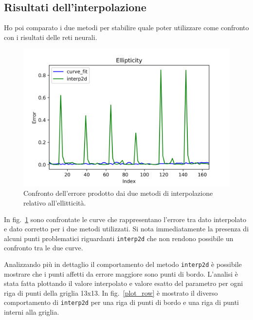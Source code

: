 \documentclass[12pt,a4paper,final]{book}
\begin{document}
\subsection{Risultati dell'interpolazione}\label{risultati_interpolazione}
Ho poi comparato i due metodi per stabilire quale poter utilizzare come confronto con i risultati delle reti neurali.
\begin{figure}[!ht]
	\centering
	\includegraphics[scale=0.8]{../figures/error_comparison_all.png}
	\caption{Confronto dell'errore prodotto dai due metodi di interpolazione relativo all'ellitticità.}
	\label{err_int}
\end{figure}
In fig.~\ref{err_int} sono confrontate le curve che rappresentano l'errore tra dato interpolato e dato corretto per i due metodi utilizzati. Si nota immediatamente la presenza di alcuni punti problematici riguardanti \texttt{interp2d} che non rendono possibile un confronto tra le due curve.


Analizzando più in dettaglio il comportamento del metodo \texttt{interp2d} è possibile mostrare che i punti affetti da errore maggiore sono punti di bordo. L'analisi è stata fatta plottando il valore interpolato e valore esatto del parametro per ogni riga di punti della griglia 13x13.
In fig.~\ref{plot_row} è mostrato il diverso comportamento di \texttt{interp2d} per una riga di punti di bordo e una riga di punti interni alla griglia.
\end{document}
